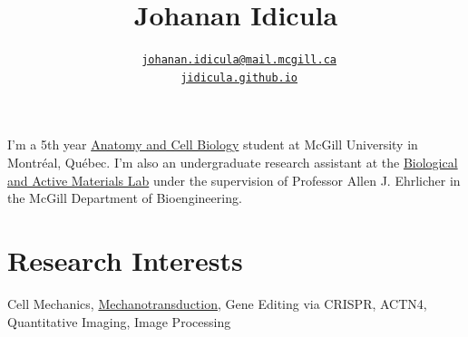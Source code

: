 \documentclass[%
	12pt,%
	]
	{article}
\title{\bfseries\Huge Johanan Idicula}
\author{\tt{\faEnvelopeO{} \href{mailto:johanan.idicula@mail.mcgill.ca}{johanan.idicula@mail.mcgill.ca}} \\ \tt{\faGlobe{} \href{https://jidicula.github.io/}{jidicula.github.io}}}
\date{} %
\begin{document}
\begin{minipage}{0.65\textwidth}
\begingroup
\maketitle
\endgroup
\end{minipage}                  %
\begin{minipage}{0.3\textwidth}
\end{minipage}

\pagestyle{fancy}
\setlength\headheight{14pt}


\thispagestyle{fancy}

I'm a 5th year \href{http://www.mcgill.ca/anatomy}{Anatomy and Cell Biology} student at McGill University in Montr\'eal, Qu\'ebec. I'm also an undergraduate research assistant at the \href{http://bam.lab.mcgill.ca/}{Biological and Active Materials Lab} under the supervision of Professor Allen J. Ehrlicher in the McGill Department of Bioengineering.

\section*{Research Interests}

Cell Mechanics, \href{http://bam.lab.mcgill.ca/project_pages/ACTN4_Mechanosensitivity.html}{Mechanotransduction}, Gene Editing via CRISPR, ACTN4, Quantitative Imaging, Image Processing
\end{document}

